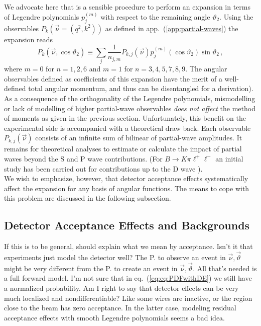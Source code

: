 \documentclass[aps,prd,reprint,nofootinbib,preprintnumbers]{revtex4}
\newcommand{\refapp}[1]{app.~(\ref{app:#1})}
\newcommand{\refeq}[1]{eq.~(\ref{eq:#1})}
\newcommand{\nuvec}{\vec{\nu}}
\newcommand{\thvec}{\vec{\vartheta}}
\renewcommand{\theta}{\vartheta}
\newcommand{\fred}[1]{{\color{brown!85!black}#1}}
\begin{document}
We advocate here that is a sensible procedure to perform an expansion in terms of Legendre polynomials $p_{j}^{(m)}$
with respect to the remaining angle $\theta_2$. Using the observables $P_k(\vec{\nu}=(q^2, k^2))$ as defined in \refapp{partial-waves}
the expansion reads
\begin{equation}
    P_{k}(\vec{\nu},\cos\theta_2) \equiv \sum_{j} \frac{1}{n_{j,m}} P_{k,j}(\vec{\nu}) p_{j}^{(m)}(\cos\theta_2)\sin\theta_2\,,
\end{equation}
where $m=0$ for $n=1,2,6$ and $m=1$ for $n=3,4,5,7,8,9$. The angular observables defined as coefficients of this expansion
have the merit of a well-defined total angular momentum, and thus can be disentangled for
a derivation). As a consequence of the orthogonality of the Legendre polynomials, mismodelling or lack of modelling of higher
partial-wave observables \emph{does not affect} the method of moments as given in the previous section.
Unfortunately, this benefit on the experimental side is accompanied with a theoretical draw back. Each observable
$P_{k,j}(\vec{\nu})$ consists of an infinite sum of bilinear of partial-wave amplitudes. It remains for theoretical
analyses to estimate or calculate the impact of partial waves beyond the S and P wave contributions. (For $B\to K\pi\ell^+\ell^-$ an initial study has been carried out for contributions up to the D wave \cite{Das:2014}).\\

We wish to emphasize, however, that detector acceptance effects systematically affect the expansion for any basis
of angular functions. The means to cope with this problem are discussed in the following subsection.


\subsection{Detector Acceptance Effects and Backgrounds}
\label{sec:systematics:acceptance}

\fred{If this is to be general, should explain what we mean by
  acceptance. Isn't it that experiments just model the detector well?
  The P. to observe an event in $\nuvec, \thvec$ might be very
  different from the P. to create an event in $\nuvec, \thvec$. All
  that's needed is a full forward model. I'm not sure that in
  \refeq{eq:PDFwithDE} we still have a normalized probability. Am I
  right to say that detector effects can be very much localized and
  nondifferentiable? Like some wires are inactive, or the region close
  to the beam has zero acceptance. In the latter case, modeling
  residual acceptance effects with smooth Legendre polynomials seems a
  bad idea.}
\end{document}

